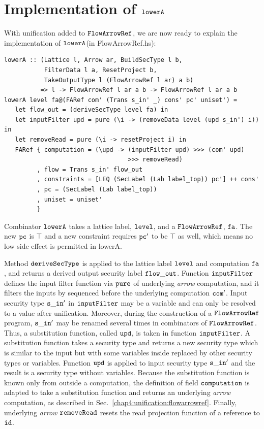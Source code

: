 \documentclass[a4paper]{report}
\newcommand{\co}[1]{$\cod{#1}$}
\begin{document}
\section{Implementation of \co{lowerA}}
\label{chap5:lower:implement}
With unification added to \co{FlowArrowRef}, we are now ready to explain the implementation
of \co{lowerA}(in FlowArrowRef.hs):
\begin{Verbatim}[fontsize=\footnotesize]
lowerA :: (Lattice l, Arrow ar, BuildSecType l b,
           FilterData l a, ResetProject b,
           TakeOutputType l (FlowArrowRef l ar) a b)
          => l -> FlowArrowRef l ar a b -> FlowArrowRef l ar a b
lowerA level fa@(FARef com' (Trans s_in' _) cons' pc' uniset') =
   let flow_out = (deriveSecType level fa) in
   let inputFilter upd = pure (\i -> (removeData level (upd s_in') i)) in
   let removeRead = pure (\i -> resetProject i) in
   FARef { computation = (\upd -> (inputFilter upd) >>> (com' upd) 
                                  >>> removeRead)
         , flow = Trans s_in' flow_out
         , constraints = [LEQ (SecLabel (Lab label_top)) pc'] ++ cons'
         , pc = (SecLabel (Lab label_top))
         , uniset = uniset'
         }
\end{Verbatim}
Combinator \co{lowerA} takes a lattice label, \co{level}, and a \co{FlowArrowRef}, \co{fa}.
The new \co{pc} is $\top$ and a new constraint requires \co{pc'} to
be $\top$ as well, which means no low side effect is permitted in lowerA. 

Method \co{deriveSecType} is applied to the lattice label \co{level} and computation \co{fa},
and returns a derived output security label \co{flow\_out}.
Function \co{inputFilter} defines the input filter function via \co{pure} of underlying {\em arrow} computation,
and it filters the inputs by sequenced before the underlying computation \co{com'}.
Input security type \co{s\_in'} in \co{inputFilter} may be a variable and can only be resolved to a value 
after unification. 
Moreover, during the construction of a \co{FlowArrowRef} program, \co{s\_in'} may be renamed several times 
in combinators of \co{FlowArrowRef}. 
Thus, a substitution function, called \co{upd}, is taken in function \co{inputFilter}. 
A substitution function takes a security type and returns a new security type which is similar to the input but
with some variables inside replaced by other security types or variables. Function \co{upd} is applied to input security
type \co{s\_in'} and the result is a security type without variables.
Because the substitution function is known only from outside a computation, the definition
of field \co{computation} is adapted to take a substitution function and returns an underlying {\em arrow} computation,
as described in Sec.~\ref{chap4:unification:flowarrowref}.
Finally, underlying {\em arrow} \co{removeRead} resets the read projection function of a reference to \co{id}.
\end{document}
